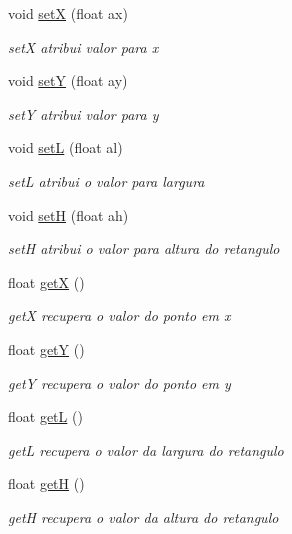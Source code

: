 \begin{DoxyCompactItemize}
\item 
void \hyperlink{classRetangulo_ae8f1addf1aa58db6bb7ecdacf24cf8b5}{setX} (float ax)
\begin{DoxyCompactList}\small\item\em setX atribui valor para x \end{DoxyCompactList}\item 
void \hyperlink{classRetangulo_a33dc14f360717587910402086d0e41ec}{setY} (float ay)
\begin{DoxyCompactList}\small\item\em setY atribui valor para y \end{DoxyCompactList}\item 
void \hyperlink{classRetangulo_a5c3c6a3b23021c98fa59d8e33ae98f5d}{setL} (float al)
\begin{DoxyCompactList}\small\item\em setL atribui o valor para largura \end{DoxyCompactList}\item 
void \hyperlink{classRetangulo_a873a695a170f2101e5b2318096a5b132}{setH} (float ah)
\begin{DoxyCompactList}\small\item\em setH atribui o valor para altura do retangulo \end{DoxyCompactList}\item 
float \hyperlink{classRetangulo_ab75dcae43c0c9b632843b2085f8bd118}{getX} ()
\begin{DoxyCompactList}\small\item\em getX recupera o valor do ponto em x \end{DoxyCompactList}\item 
float \hyperlink{classRetangulo_a2e0095a7ac3e17c4e18cef6802618206}{getY} ()
\begin{DoxyCompactList}\small\item\em getY recupera o valor do ponto em y \end{DoxyCompactList}\item 
float \hyperlink{classRetangulo_a1b470847bf9d2eb82697cfd720d85f31}{getL} ()
\begin{DoxyCompactList}\small\item\em getL recupera o valor da largura do retangulo \end{DoxyCompactList}\item 
float \hyperlink{classRetangulo_a7173c6d2b99f52f4da5d7e81fbbb07fe}{getH} ()
\begin{DoxyCompactList}\small\item\em getH recupera o valor da altura do retangulo \end{DoxyCompactList}\end{DoxyCompactItemize}



